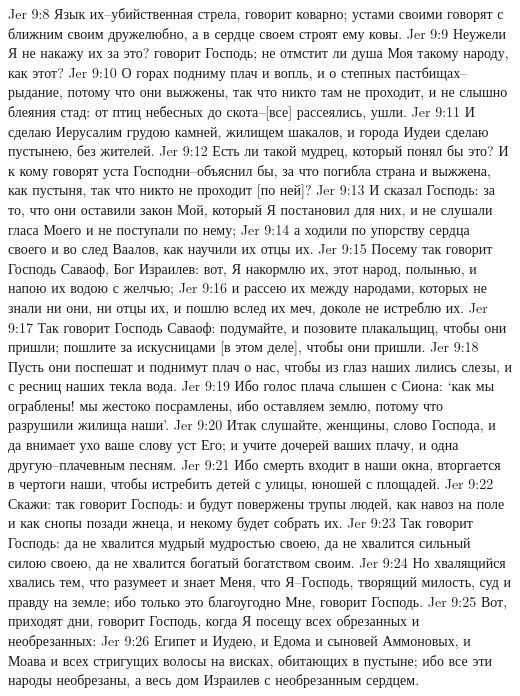 Jer 9:8  Язык их--убийственная стрела, говорит коварно; устами своими говорят с ближним своим дружелюбно, а в сердце своем строят ему ковы.
Jer 9:9  Неужели Я не накажу их за это? говорит Господь; не отмстит ли душа Моя такому народу, как этот?
Jer 9:10  О горах подниму плач и вопль, и о степных пастбищах--рыдание, потому что они выжжены, так что никто там не проходит, и не слышно блеяния стад: от птиц небесных до скота--[все] рассеялись, ушли.
Jer 9:11  И сделаю Иерусалим грудою камней, жилищем шакалов, и города Иудеи сделаю пустынею, без жителей.
Jer 9:12  Есть ли такой мудрец, который понял бы это? И к кому говорят уста Господни--объяснил бы, за что погибла страна и выжжена, как пустыня, так что никто не проходит [по ней]?
Jer 9:13  И сказал Господь: за то, что они оставили закон Мой, который Я постановил для них, и не слушали гласа Моего и не поступали по нему;
Jer 9:14  а ходили по упорству сердца своего и во след Ваалов, как научили их отцы их.
Jer 9:15  Посему так говорит Господь Саваоф, Бог Израилев: вот, Я накормлю их, этот народ, полынью, и напою их водою с желчью;
Jer 9:16  и рассею их между народами, которых не знали ни они, ни отцы их, и пошлю вслед их меч, доколе не истреблю их.
Jer 9:17  Так говорит Господь Саваоф: подумайте, и позовите плакальщиц, чтобы они пришли; пошлите за искусницами [в этом деле], чтобы они пришли.
Jer 9:18  Пусть они поспешат и поднимут плач о нас, чтобы из глаз наших лились слезы, и с ресниц наших текла вода.
Jer 9:19  Ибо голос плача слышен с Сиона: `как мы ограблены! мы жестоко посрамлены, ибо оставляем землю, потому что разрушили жилища наши'.
Jer 9:20  Итак слушайте, женщины, слово Господа, и да внимает ухо ваше слову уст Его; и учите дочерей ваших плачу, и одна другую--плачевным песням.
Jer 9:21  Ибо смерть входит в наши окна, вторгается в чертоги наши, чтобы истребить детей с улицы, юношей с площадей.
Jer 9:22  Скажи: так говорит Господь: и будут повержены трупы людей, как навоз на поле и как снопы позади жнеца, и некому будет собрать их.
Jer 9:23  Так говорит Господь: да не хвалится мудрый мудростью своею, да не хвалится сильный силою своею, да не хвалится богатый богатством своим.
Jer 9:24  Но хвалящийся хвались тем, что разумеет и знает Меня, что Я--Господь, творящий милость, суд и правду на земле; ибо только это благоугодно Мне, говорит Господь.
Jer 9:25  Вот, приходят дни, говорит Господь, когда Я посещу всех обрезанных и необрезанных:
Jer 9:26  Египет и Иудею, и Едома и сыновей Аммоновых, и Моава и всех стригущих волосы на висках, обитающих в пустыне; ибо все эти народы необрезаны, а весь дом Израилев с необрезанным сердцем.
